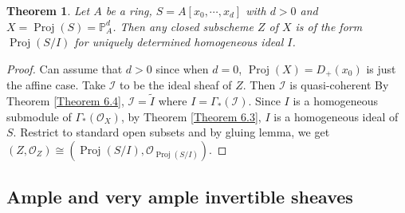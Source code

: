 \documentclass{ctexart}
\newtheorem{theorem}{Theorem}[section]
\newcommand{\proj}{\operatorname{Proj}}
\begin{document}
\begin{theorem}
    Let $A$ be a ring, $S = A[x_{0}, \cdots, x_{d}]$ with $d > 0$ and $X = \proj(S) = \mathbb{P}_{A}^{d}$.
    Then any closed subscheme $Z$ of $X$ is of the form $\proj(S/I)$ for uniquely determined homogeneous ideal $I$.
    \label{Theorem 6.5}
\end{theorem}
\begin{proof}
    Can assume that $d > 0$ since when $d = 0$, $\proj(X) = D_{+}(x_{0})$ is just the affine case.
    Take $\mathcal{I}$ to be the ideal sheaf of $Z$.
    Then $\mathcal{I}$ is quasi-coherent
    By Theorem \ref{Theorem 6.4}, $\mathcal{I} = \widetilde{I}$ where $I = \Gamma_{\ast}(\mathcal{I})$.
    Since $I$ is a homogeneous submodule of $\Gamma_{\ast}(\mathcal{O}_{X})$, by Theorem \ref{Theorem 6.3}, $I$ is a homogeneous ideal of $S$.
    Restrict to standard open subsets and by gluing lemma, we get $(Z, \mathcal{O}_{Z}) \cong (\proj (S/I), \mathcal{O}_{\proj (S/I)})$.
\end{proof}

\subsection{Ample and very ample invertible sheaves}
\label{subsection:Sheaves_of_Modules_Ample_and_very_ample_invertible_sheaves}
\end{document}
